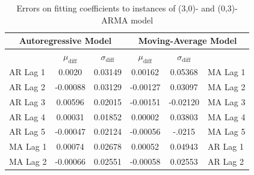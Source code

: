 \documentclass[oneside,12pt,openany]{book}
\begin{document}
    \begin{table}[hbt!]
        \centering
        \begin{tabular}{|l|c|c|c|c|l|}
            \hline
            \multicolumn{3}{|c|}{Autoregressive Model} & \multicolumn{3}{c|}{Moving-Average Model} \\ \hline
             \cellcolor{black} & $\mu_{\text{diff}}$ & $\sigma_{\text{diff}}$ & $\mu_{\text{diff}}$ & $\sigma_{\text{diff}}$ &  \cellcolor{black} \\ \hline
            AR Lag 1 & 0.0020 & 0.03149 & 0.00162 & 0.05368 & MA Lag 1 \\ \hline
            AR Lag 2 & -0.00088 & 0.03129 & -0.00127 & 0.03097 & MA Lag 2 \\ \hline
            AR Lag 3 & 0.00596 & 0.02015 & -0.00151 & -0.02120 & MA Lag 3 \\ \hline
            AR Lag 4 & 0.00031 & 0.01852 & 0.00002 & 0.03803 & MA Lag 4 \\ \hline
            AR Lag 5 & -0.00047 & 0.02124 & -0.00056 & -.0215 & MA Lag 5 \\ \hline
            MA Lag 1 & 0.00074 & 0.02678 & 0.00052 & 0.04943 & AR Lag 1 \\ \hline
            MA Lag 2 & -0.00066 & 0.02551 & -0.00058 & 0.02553 & AR Lag 2 \\ \hline
        \end{tabular}
    \caption{Errors on fitting coefficients to instances of (3,0)- and (0,3)-ARMA model}
    \label{tab:errortsfitting3}
    \end{table}
\end{document}
